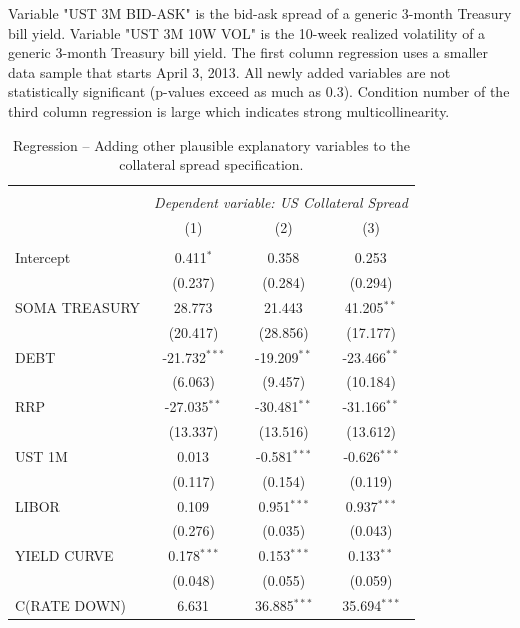 \documentclass[11pt,a4paper,english,oneside]{article}
\begin{document}
\begin{appendices}
\begin{table}[!htbp] \centering
\caption{Regression -- Adding other plausible explanatory variables to the collateral spread specification.}
\label{table:reg3}
\vspace{-10pt}
\begin{flushleft}
Variable "UST 3M BID-ASK" is the bid-ask spread of a generic 3-month Treasury bill yield. Variable "UST 3M 10W VOL" is the 10-week realized volatility of a generic 3-month Treasury bill yield. The first column regression uses a smaller data sample that starts April 3, 2013. All newly added variables are not statistically significant (p-values exceed as much as 0.3). Condition number of the third column regression is large which indicates strong multicollinearity.
\end{flushleft}
\begin{tabular}{@{\extracolsep{5pt}}lccc}
\\[-1.8ex]\hline
\hline \\[-1.8ex]
& \multicolumn{3}{c}{\textit{Dependent variable: US Collateral Spread}} \
\cr \cline{3-4}
\\[-1.8ex] & (1) & (2) & (3) \\
\hline \\[-1.8ex]
 Intercept & 0.411$^{*}$ & 0.358$^{}$ & 0.253$^{}$ \\
  & (0.237) & (0.284) & (0.294) \\
 SOMA TREASURY & 28.773$^{}$ & 21.443$^{}$ & 41.205$^{**}$ \\
  & (20.417) & (28.856) & (17.177) \\
 DEBT & -21.732$^{***}$ & -19.209$^{**}$ & -23.466$^{**}$ \\
  & (6.063) & (9.457) & (10.184) \\
 RRP & -27.035$^{**}$ & -30.481$^{**}$ & -31.166$^{**}$ \\
  & (13.337) & (13.516) & (13.612) \\
 UST 1M & 0.013$^{}$ & -0.581$^{***}$ & -0.626$^{***}$ \\
  & (0.117) & (0.154) & (0.119) \\
 LIBOR & 0.109$^{}$ & 0.951$^{***}$ & 0.937$^{***}$ \\
  & (0.276) & (0.035) & (0.043) \\
 YIELD CURVE & 0.178$^{***}$ & 0.153$^{***}$ & 0.133$^{**}$ \\
  & (0.048) & (0.055) & (0.059) \\
 C(RATE DOWN) & 6.631$^{}$ & 36.885$^{***}$ & 35.694$^{***}$ \\

\end{tabular}
\end{table}
\end{appendices}
\end{document}
